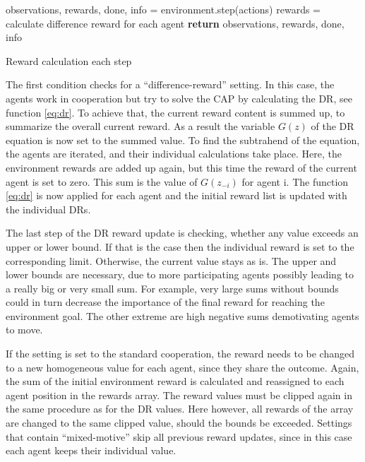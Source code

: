 \begin{algorithm}[H]
    \DontPrintSemicolon
    observations, rewards, done, info = environment.step(actions)\;
    \;
     {
        rewards = calculate difference reward for each agent
    }
    \;
    \;
    \;
    \textbf{return} observations, rewards, done, info\;
    \caption{Reward calculation each step}\label{algo:step_reward}
\end{algorithm}

The first condition checks for a ``difference-reward'' setting. In this case, the agents work in cooperation but try to solve the CAP by calculating the DR, see function \eqref{eq:dr}. To achieve that, the current reward content is summed up, to summarize the overall current reward. As a result the variable $G(z)$ of the DR equation is now set to the summed value. To find the subtrahend of the equation, the agents are iterated, and their individual calculations take place. Here, the environment rewards are added up again, but this time the reward of the current agent is set to zero. This sum is the value of $G(z_{-i})$ for agent i. The function \eqref{eq:dr} is now applied for each agent and the initial reward list is updated with the individual DRs. 

The last step of the DR reward update is checking, whether any value exceeds an upper or lower bound. If that is the case then the individual reward is set to the corresponding limit. Otherwise, the current value stays as is. The upper and lower bounds are necessary, due to more participating agents possibly leading to a really big or very small sum. For example, very large sums without bounds could in turn decrease the importance of the final reward for reaching the environment goal. The other extreme are high negative sums demotivating agents to move.

If the setting is set to the standard cooperation, the reward needs to be changed to a new homogeneous value for each agent, since they share the outcome. Again, the sum of the initial environment reward is calculated and reassigned to each agent position in the rewards array. The reward values must be clipped again in the same procedure as for the DR values. Here however, all rewards of the array are changed to the same clipped value, should the bounds be exceeded. Settings that contain ``mixed-motive'' skip all previous reward updates, since in this case each agent keeps their individual value.

